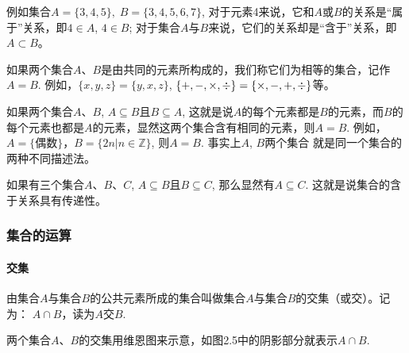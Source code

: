 例如集合$A=\{3, 4, 5\},\; B=\{3, 4, 5, 6, 7\}$, 对于元素4来说，它和$A$或$B$的关系是“属于”关系，即$4\in A$, $4\in B$; 对于集合$A$与$B$来说，它们的关系却是“含于”关系，即$A\subset B$。

如果两个集合$A$、$B$是由共同的元素所构成的，我们称它们为相等的集合，记作$A=B$. 例如，$\{x,y,z\}=\{y,x, z\}$, $\{+, -, \times, \div \}=\{ \times, -,+,\div\}$等。

如果两个集合$A$、$B$, $A\subseteq B$且$B\subseteq A$, 这就是说$A$的每个元素都是$B$的元素，而$B$的每个元素也都是$A$的元素，显然这两个集合含有相同的元素，则$A=B$. 例如，$A=\{\text{偶数}\}$，$B=\{2n|n\in\mathbb{Z}\}$, 则$A=B$. 事实上$A$, $B$两个集合
就是同一个集合的两种不同描述法。

如果有三个集合$A$、$B$、$C$, $A\subseteq B$且$B\subseteq C$, 那么显然有$A\subseteq C$. 这就是说集合的含于关系具有传递性。

\subsubsection{集合的运算}

\paragraph{交集}
由集合$A$与集合$B$的公共元素所成的集合叫做集合$A$与集合$B$的交集（或交）。记为：
$A\cap B$，读为$A$交$B$.
\begin{figure}[htp]\centering
    \begin{minipage}[t]{0.48\textwidth}
    \centering
{}
    \caption{}
    \end{minipage}
    \begin{minipage}[t]{0.48\textwidth}
    \centering
    \caption{}
    \end{minipage}
    \end{figure}


两个集合$A$、$B$的交集用维恩图来示意，如图2.5中的阴影部分就表示$A\cap B$.

